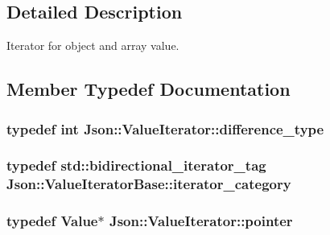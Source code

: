\subsection{Detailed Description}
Iterator for object and array value. 

\subsection{Member Typedef Documentation}
\subsubsection[{\texorpdfstring{difference\+\_\+type}{difference_type}}]{\setlength{\rightskip}{0pt plus 5cm}typedef int {\bf Json\+::\+Value\+Iterator\+::difference\+\_\+type}}\hypertarget{classJson_1_1ValueIterator_a2be1a9aa60bbfc8812e9dd1a7f1a8786}{}\label{classJson_1_1ValueIterator_a2be1a9aa60bbfc8812e9dd1a7f1a8786}
\subsubsection[{\texorpdfstring{iterator\+\_\+category}{iterator_category}}]{\setlength{\rightskip}{0pt plus 5cm}typedef std\+::bidirectional\+\_\+iterator\+\_\+tag {\bf Json\+::\+Value\+Iterator\+Base\+::iterator\+\_\+category}\hspace{0.3cm}{\ttfamily [inherited]}}\hypertarget{classJson_1_1ValueIteratorBase_a02fd11a4fbdc0007da1e8bcf5e6b83c3}{}\label{classJson_1_1ValueIteratorBase_a02fd11a4fbdc0007da1e8bcf5e6b83c3}
\subsubsection[{\texorpdfstring{pointer}{pointer}}]{\setlength{\rightskip}{0pt plus 5cm}typedef {\bf Value}$\ast$ {\bf Json\+::\+Value\+Iterator\+::pointer}}\hypertarget{classJson_1_1ValueIterator_acec45feb1ef1f3bf81240157d06d5432}{}\label{classJson_1_1ValueIterator_acec45feb1ef1f3bf81240157d06d5432}
